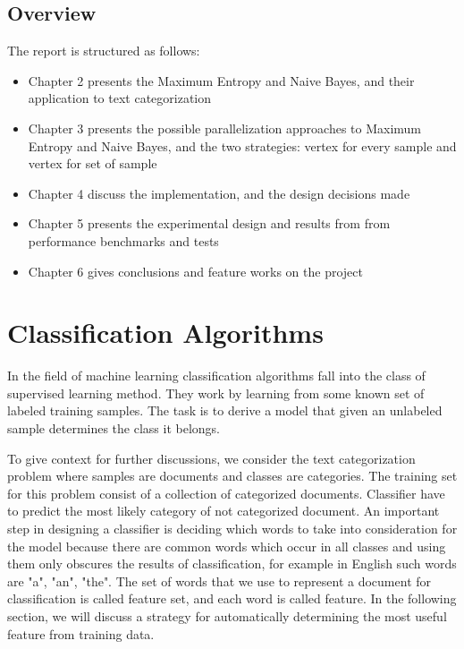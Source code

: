 \documentclass{report}
\begin{document}
\section{Overview}

The report is structured as follows: 

\begin{itemize}
\item Chapter 2 presents the Maximum Entropy and Naive Bayes, and their application to text categorization
\item Chapter 3 presents the possible parallelization approaches to Maximum Entropy and Naive Bayes, and the two strategies: vertex for every sample and vertex for set of sample
\item Chapter 4 discuss the implementation, and the design decisions made
\item Chapter 5 presents the experimental design and results from from performance benchmarks and tests
\item Chapter 6 gives conclusions and feature works on the project
\end{itemize}

\chapter{Classification Algorithms}

In the field of machine learning classification algorithms fall into the class of supervised learning method. They work by learning from some known set of labeled training samples. The task is to derive a model that  given an unlabeled sample determines the class it belongs.

To give context for further discussions, we consider the text categorization problem where samples are documents and classes are categories. The training set for this problem consist of a collection of categorized documents. Classifier have to predict the most likely category of not categorized document. An important step in designing a classifier is deciding which words to take into consideration for the model because there are common words which occur in all classes and using them only obscures the results of classification, for example in English such words are "a", "an", "the". The set of words that we use to represent a document for classification is called feature set, and each word is called feature. In the following section, we will discuss a strategy for automatically determining the most useful feature from training data.
\end{document}
